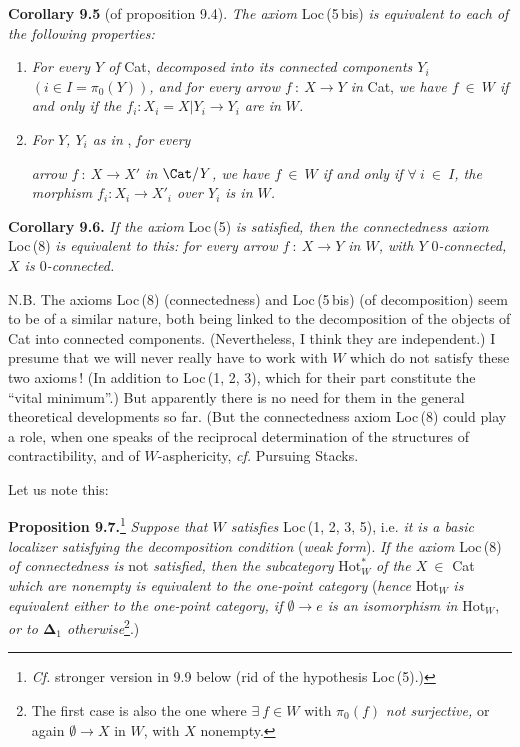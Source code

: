 \textbf{Corollary 9.5} (of proposition 9.4). \textit{The axiom} Loc\,(5\,bis) \textit{is equivalent to each of the following properties:}
\begin{enumerate}[label={}, leftmargin=3em]
\item[\cercle{a}] \textit{For every $Y$ of} Cat, \textit{decomposed into its connected components $Y_i$ $(i\in I=\pi_0(Y))$, and for every arrow $f\ :\ X\longrightarrow Y$ in} Cat, \textit{we have $f\ \in\ W$ if and only if the $f_i : X_i=X|Y_i\longrightarrow Y_i$ are in $W$.}
\item[\cercle{b}] \textit{For $Y$, $Y_i$ as in} , \textit{for every}


\textit{arrow $f\ :\ X\longrightarrow X'$ in $\Cat/Y$, we have $f\ \in\ W$ if and only if $\forall\ i\ \in\ I$, the morphism $f_i : X_i\longrightarrow X'_i$ over $Y_i$ is in $W$.}
\end{enumerate}

\textbf{Corollary 9.6.} \textit{If the axiom} Loc\,(5) \textit{is satisfied, then the connectedness axiom} Loc\,(8) \textit{is equivalent to this: for every arrow $f\ :\ X\longrightarrow Y$ in $W$, with $Y$ $0$-connected, $X$ is $0$-connected.}


N.B. The axioms Loc\,(8) (connectedness) and Loc\,(5\,bis) (of decomposition) seem to be of a similar nature, both being linked to the decomposition of the objects of Cat into connected components. (Nevertheless, I think they are independent.) I presume that we will never really have to work with $W$ which do not satisfy these two axioms\,! (In addition to Loc\,(1, 2, 3), which for their part constitute the ``vital minimum''.) But apparently there is no need for them in the general theoretical developments so far. (But the connectedness axiom Loc\,(8) could play a role, when one speaks of the reciprocal determination of the structures of contractibility, and of $W$-asphericity, \textit{cf.} Pursuing Stacks. %


Let us note this:

\textbf{Proposition 9.7.}\footnote[50]{\textit{Cf.} stronger version in 9.9 below (rid of the hypothesis Loc\,(5).)} \textit{Suppose that $W$ satisfies} Loc\,(1, 2, 3, 5), i.e. \textit{it is a basic localizer satisfying the decomposition condition} (\textit{weak form}). \textit{If the axiom} Loc\,(8) \textit{of connectedness is} not \textit{satisfied, then the subcategory} $\mathrm{Hot}^*_W$ \textit{of the $X\ \in$} Cat \textit{which are nonempty is equivalent to the one-point category} (\textit{hence} $\mathrm{Hot}_W$ \textit{is equivalent either to the one-point category, if $\emptyset\longrightarrow e$ is an isomorphism in} $\mathrm{Hot}_W$, \textit{or to $\boldsymbol{\Delta}_1$ otherwise}\footnote[51]{The first case is also the one where $\exists\ f\in W$ with $\pi_0(f)$ \textit{not surjective,} or again $\emptyset\longrightarrow X$ in $W$, with $X$ nonempty.}.)

